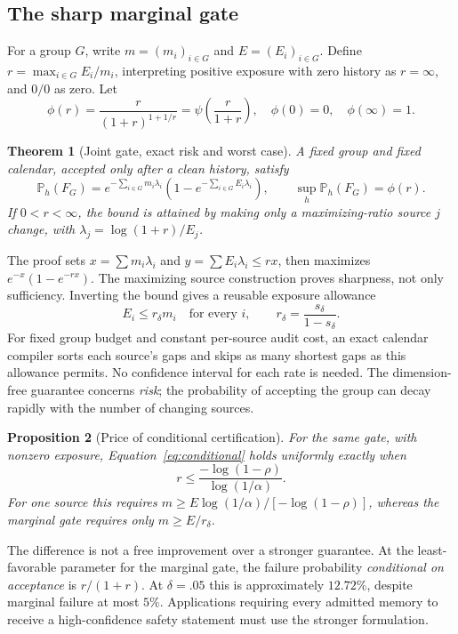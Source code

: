 \documentclass{article}
\newtheorem{theorem}{Theorem}
\newtheorem{proposition}[theorem]{Proposition}
\newcommand{\Pp}{\mathbb P}
\newcommand{\1}{\mathbf 1}
\begin{document}
\subsection{The sharp marginal gate}
For a group $G$, write $m=(m_i)_{i\in G}$ and $E=(E_i)_{i\in G}$. Define $r=\max_{i\in G}E_i/m_i$, interpreting positive exposure with zero history as $r=\infty$, and $0/0$ as zero. Let
\begin{equation}
 \phi(r)=\frac{r}{(1+r)^{1+1/r}}=\psi\!\left(\frac{r}{1+r}\right),
 \quad \phi(0)=0,\quad\phi(\infty)=1.\label{eq:phi}
\end{equation}
\begin{theorem}[Joint gate, exact risk and worst case]\label{thm:gate}
A fixed group and fixed calendar, accepted only after a clean history, satisfy
\begin{equation}
 \Pp_h(F_G)=e^{-\sum_{i\in G}m_i\lambda_i}
 \left(1-e^{-\sum_{i\in G}E_i\lambda_i}\right),\qquad
 \sup_h\Pp_h(F_G)=\phi(r).\label{eq:gate}
\end{equation}
If $0<r<\infty$, the bound is attained by making only a maximizing-ratio source $j$ change, with $\lambda_j=\log(1+r)/E_j$.
\end{theorem}

The proof sets $x=\sum m_i\lambda_i$ and $y=\sum E_i\lambda_i\leq rx$, then maximizes $e^{-x}(1-e^{-rx})$. The maximizing source construction proves sharpness, not only sufficiency. Inverting the bound gives a reusable exposure allowance
\begin{equation}
 E_i\leq r_\delta m_i\quad\text{for every }i,\qquad r_\delta=\frac{s_\delta}{1-s_\delta}.\label{eq:allowance}
\end{equation}
For fixed group budget and constant per-source audit cost, an exact calendar compiler sorts each source's gaps and skips as many shortest gaps as this allowance permits. No confidence interval for each rate is needed. The dimension-free guarantee concerns \emph{risk}; the probability of accepting the group can decay rapidly with the number of changing sources.

\begin{proposition}[Price of conditional certification]\label{prop:conditional}
For the same gate, with nonzero exposure, Equation~\eqref{eq:conditional} holds uniformly exactly when
\begin{equation}
 r\leq\frac{-\log(1-\rho)}{\log(1/\alpha)}.\label{eq:pac}
\end{equation}
For one source this requires $m\geq E\log(1/\alpha)/[-\log(1-\rho)]$, whereas the marginal gate requires only $m\geq E/r_\delta$.
\end{proposition}
The difference is not a free improvement over a stronger guarantee. At the least-favorable parameter for the marginal gate, the failure probability \emph{conditional on acceptance} is $r/(1+r)$. At $\delta=.05$ this is approximately $12.72\%$, despite marginal failure at most $5\%$. Applications requiring every admitted memory to receive a high-confidence safety statement must use the stronger formulation.
\end{document}
